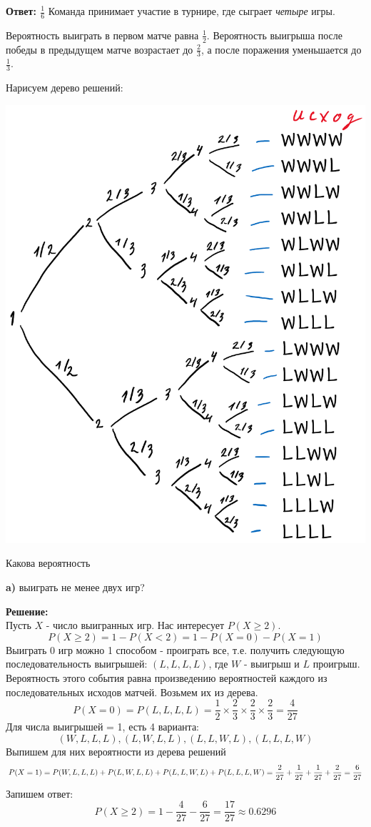 \documentclass[a4paper,12pt]{article}
\renewcommand{\geq}{\geqslant}
\newcounter{z}
\newcommand{\z}{\refstepcounter{z}\vskip 20pt\noindent
\fbox{\textbf{\arabic{z}}} }
\begin{document}
\textbf{Ответ: $\frac{1}{6}$}
\z Команда принимает участие в турнире, где сыграет {\it четыре} игры.

Вероятность выиграть в первом матче равна $\frac 12$. Вероятность выигрыша после победы в предыдущем матче возрастает до $\frac 23$, а после поражения уменьшается до $\frac 13$.

Нарисуем дерево решений:

\includegraphics[scale=1]{tree.png}


Какова вероятность

{\bf a)} выиграть не менее двух игр?

\textbf{Решение:}\\
Пусть $X$ - число выигранных игр. Нас интересует $P(X\geq2)$.
$$P(X\geq2) = 1 - P(X<2) = 1 - P(X = 0) - P(X = 1)$$
Выиграть 0 игр можно 1 способом - проиграть все, т.е. получить следующую последовательность выигрышей: $(L, L, L, L)$, где $W$ - выигрыш и $L$ проигрыш. Вероятность этого события равна произведению вероятностей каждого из последовательных исходов матчей. Возьмем их из дерева.
$$P(X = 0) = P(L, L, L, L) =\frac{1}{2}\times\frac{2}{3}\times\frac{2}{3}\times\frac{2}{3} = \frac{4}{27}$$
Для числа выигрышей = 1, есть 4 варианта:
$$(W, L, L, L), (L, W, L, L), (L, L, W, L), (L, L, L, W)$$
Выпишем для них вероятности из дерева решений
$$
P(X = 1) = P(W, L, L, L)+P(L, W, L, L) + P(L, L, W, L)+P(L, L, L, W) \\= \frac{2}{27}+\frac{1}{27}+\frac{1}{27}+\frac{2}{27} = \frac{6}{27}
$$
Запишем ответ:
$$P(X\geq2) = 1 - \frac{4}{27} - \frac{6}{27} = \frac{17}{27} \approx0.6296$$
\end{document}
